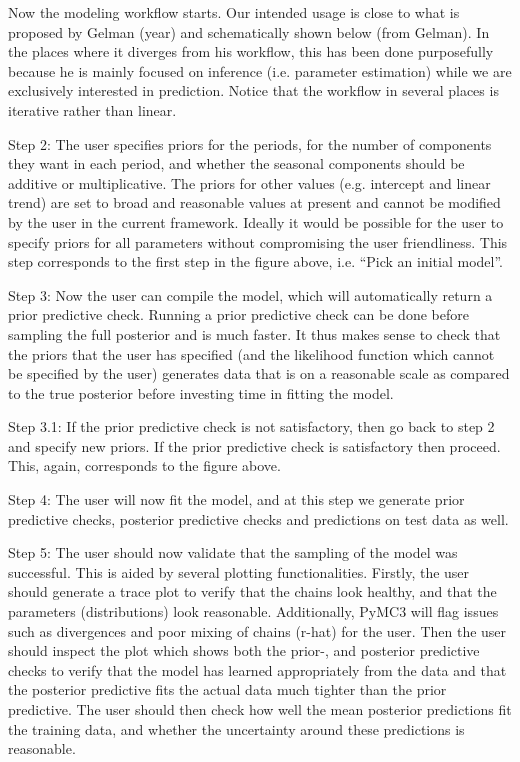 \documentclass{article}
\begin{document}
Now the modeling workflow starts. Our intended usage is close to what is proposed by Gelman (year) and schematically shown below (from Gelman). In the places where it diverges from his workflow, this has been done purposefully because he is mainly focused on inference (i.e. parameter estimation) while we are exclusively interested in prediction. Notice that the workflow in several places is iterative rather than linear.

Step 2: The user specifies priors for the periods, for the number of components they want in each period, and whether the seasonal components should be additive or multiplicative. The priors for other values (e.g. intercept and linear trend) are set to broad and reasonable values at present and cannot be modified by the user in the current framework. Ideally it would be possible for the user to specify priors for all parameters without compromising the user friendliness. This step corresponds to the first step in the figure above, i.e. “Pick an initial model”. 

Step 3: Now the user can compile the model, which will automatically return a prior predictive check. Running a prior predictive check can be done before sampling the full posterior and is much faster. It thus makes sense to check that the priors that the user has specified (and the likelihood function which cannot be specified by the user) generates data that is on a reasonable scale as compared to the true posterior before investing time in fitting the model.

Step 3.1: If the prior predictive check is not satisfactory, then go back to step 2 and specify new priors. If the prior predictive check is satisfactory then proceed. This, again, corresponds to the figure above.

Step 4: The user will now fit the model, and at this step we generate prior predictive checks, posterior predictive checks and predictions on test data as well. 

Step 5:  The user should now validate that the sampling of the model was successful. This is aided by several plotting functionalities. Firstly, the user should generate a trace plot to verify that the chains look healthy, and that the parameters (distributions) look reasonable. Additionally, PyMC3 will flag issues such as divergences and poor mixing of chains (r-hat) for the user. Then the user should inspect the plot which shows both the prior-, and posterior predictive checks to verify that the model has learned appropriately from the data and that the posterior predictive fits the actual data much tighter than the prior predictive. The user should then check how well the mean posterior predictions fit the training data, and whether the uncertainty around these predictions is reasonable. 
\end{document}
